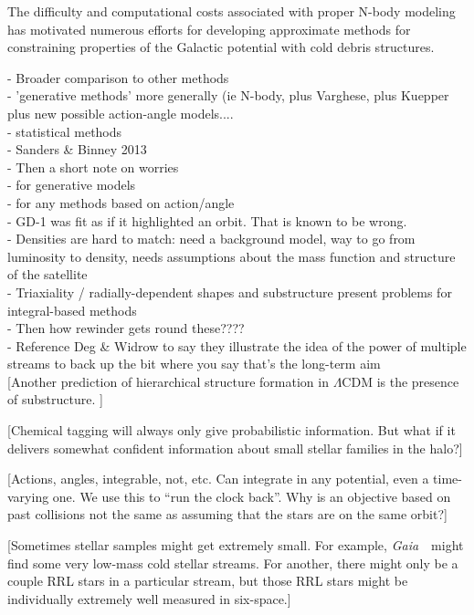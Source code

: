 \documentclass[letterpaper,12pt,preprint]{aastex}
\newcommand{\project}[1]{\textsl{#1}}
\newcommand{\gaia}{\project{Gaia}~}
\begin{document}
The difficulty and computational costs associated with proper N-body modeling has motivated numerous efforts for developing approximate methods for constraining properties of the Galactic potential with cold debris structures. 

- Broader comparison to other methods\\
\indent\indent- 'generative methods' more generally (ie N-body, plus Varghese, plus Kuepper plus new possible action-angle models....\\
\indent\indent- statistical methods\\
\indent\indent- Sanders \& Binney 2013\\
- Then a short note on worries\\
\indent\indent- for generative models\\
\indent\indent- for any methods based on action/angle \\
\indent\indent- GD-1 was fit as if it highlighted an orbit.  That is known to be wrong.\\
\indent\indent- Densities are hard to match: need a background model, way to go from luminosity to density, needs assumptions about the mass function and structure of the satellite\\
\indent\indent- Triaxiality / radially-dependent shapes and substructure present problems for integral-based methods\\
- Then how rewinder gets round these????\\
\indent\indent- Reference Deg \& Widrow to say they illustrate the idea of the power of multiple streams to back up the bit where you say that's the long-term aim\\

[Another prediction of hierarchical structure formation in $\Lambda$CDM is the presence of substructure. ]

[Chemical tagging will always only give probabilistic information.
  But what if it delivers somewhat confident information about small
  stellar families in the halo?]

[Actions, angles, integrable, not, etc.  Can integrate in any
  potential, even a time-varying one. We use this to
  ``run the clock back''.  Why is an objective based on past collisions not the
  same as assuming that the stars are on the same orbit?]



[Sometimes stellar samples might get extremely small.  For example,
  \gaia\ might find some very low-mass cold stellar streams.  For
  another, there might only be a couple RRL stars in a particular
  stream, but those RRL stars might be individually extremely well
  measured in six-space.]
\end{document}
